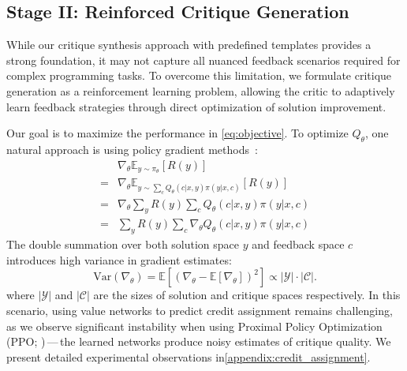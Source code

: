 

\subsection{Stage II: Reinforced Critique Generation}
While our critique synthesis approach with predefined templates provides a strong foundation, it may not capture all nuanced feedback scenarios required for complex programming tasks. To overcome this limitation, we formulate critique generation as a reinforcement learning problem, allowing the critic to adaptively learn feedback strategies through direct optimization of solution improvement.


Our goal is to maximize the performance in \cref{eq:objective}.
To optimize $Q_\theta$, one natural approach is using policy gradient methods~\cite{sutton1999policy}:
\begin{equation*}
\begin{aligned}
    &\nabla_\theta \mathbb{E}_{y \sim \pi_{\theta}}[R(y)] \\
    = &\nabla_\theta \mathbb{E}_{y \sim \sum_c Q_\theta(c|x,y)\pi(y|x,c)}[R(y)] \\
    = &\nabla_\theta \sum_y R(y) \sum_c Q_\theta(c|x,y)\pi(y|x,c) \\
    = &\sum_y R(y) \sum_c \nabla_\theta Q_\theta(c|x,y)\pi(y|x,c)
\end{aligned}
\end{equation*}
The double summation over both solution space $y$ and feedback space $c$ introduces high variance in gradient estimates:
\begin{equation*}
    \mathrm{Var}(\nabla_\theta) = \mathbb{E}[(\nabla_\theta - \mathbb{E}[\nabla_\theta])^2] \propto |\mathcal{Y}| \cdot |\mathcal{C}|.
\end{equation*}
where $|\mathcal{Y}|$ and $|\mathcal{C}|$ are the sizes of solution and critique spaces respectively.
In this scenario, using value networks to predict credit assignment remains challenging, as we observe significant instability when using Proximal Policy Optimization (PPO; \citealt{schulman2017proximal})\,---\,the learned networks produce noisy estimates of critique quality.
We present detailed experimental observations in\cref{appendix:credit_assignment}.








